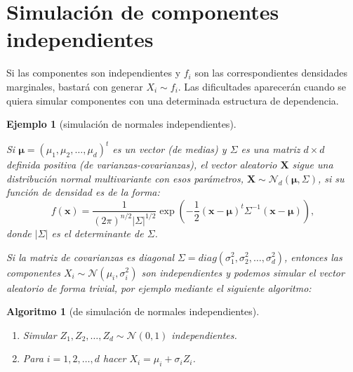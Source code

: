 \documentclass[
]{book}
\theoremstyle{break}
\newtheorem{conjecture}{Algoritmo}[chapter]
\newtheorem{example}{Ejemplo}[chapter]
\theoremstyle{nonumberplain}
\begin{document}
\hypertarget{simulaciuxf3n-de-componentes-independientes}{%
\section{Simulación de componentes independientes}\label{simulaciuxf3n-de-componentes-independientes}}

Si las componentes son independientes y \(f_i\) son las correspondientes densidades marginales, bastará con generar \(X_i \sim f_i\).
Las dificultades aparecerán cuando se quiera simular componentes con una determinada estructura de dependencia.

\begin{example}[simulación de normales independientes]
\protect\hypertarget{exm:normind}{}\label{exm:normind}

Si \(\boldsymbol\mu =\left( \mu_1,\mu_2,\ldots,\mu_d\right)^t\) es un vector (de medias) y
\(\Sigma\) es una matriz \(d \times d\) definida positiva (de varianzas-covarianzas), el vector aleatorio \(\mathbf{X}\) sigue una distribución normal multivariante con esos parámetros,
\(\mathbf{X} \sim \mathcal{N}_d\left( \boldsymbol\mu,\Sigma \right)\),
si su función de densidad es de la forma:
\[f(\mathbf x) = \frac{1}{(2\pi)^{n/2}|\Sigma|^{1/2}}
\exp \left( -\frac{1}{2} ( \mathbf x - \boldsymbol \mu)^t \Sigma^{-1} (\mathbf x - \boldsymbol \mu)
\right),\]
donde \(| \Sigma |\) es el determinante de \(\Sigma\).

Si la matriz de covarianzas es diagonal \(\Sigma=diag\left( \sigma_1^2,\sigma_2^2,\ldots,\sigma_d^2\right)\),
entonces las componentes \(X_i \sim \mathcal{N}\left( \mu_i,\sigma_i^2\right)\)
son independientes y podemos simular el vector aleatorio de forma trivial, por ejemplo mediante el siguiente algoritmo:
\end{example}

\begin{conjecture}[de simulación de normales independientes]
\protect\hypertarget{cnj:mnorm-indep}{}\label{cnj:mnorm-indep}

\begin{enumerate}
\def\labelenumi{\arabic{enumi}.}
\item
  Simular \(Z_1, Z_2, \ldots, Z_d \sim \mathcal{N} \left( 0, 1 \right)\) independientes.
\item
  Para \(i = 1, 2, \ldots, d\) hacer \(X_i = \mu_i + \sigma_i Z_i\).
\end{enumerate}

\end{conjecture}
\end{document}
